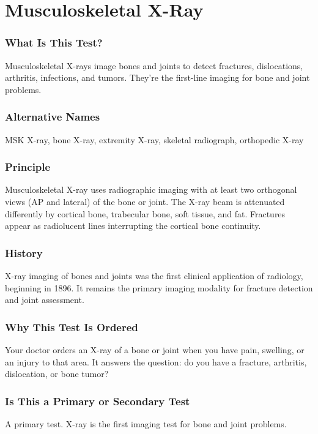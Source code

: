 \section{Musculoskeletal X-Ray}


\subsubsection*{What Is This Test?}
Musculoskeletal X-rays image bones and joints to detect fractures, dislocations, arthritis, infections, and tumors. They're the first-line imaging for bone and joint problems.

\subsubsection*{Alternative Names}
MSK X-ray, bone X-ray, extremity X-ray, skeletal radiograph, orthopedic X-ray


\subsubsection*{Principle}
Musculoskeletal X-ray uses radiographic imaging with at least two orthogonal views (AP and lateral) of the bone or joint. The X-ray beam is attenuated differently by cortical bone, trabecular bone, soft tissue, and fat. Fractures appear as radiolucent lines interrupting the cortical bone continuity.

\subsubsection*{History}
X-ray imaging of bones and joints was the first clinical application of radiology, beginning in 1896. It remains the primary imaging modality for fracture detection and joint assessment.

\subsubsection*{Why This Test Is Ordered}
Your doctor orders an X-ray of a bone or joint when you have pain, swelling, or an injury to that area. It answers the question: do you have a fracture, arthritis, dislocation, or bone tumor?

\subsubsection*{Is This a Primary or Secondary Test}
A primary test. X-ray is the first imaging test for bone and joint problems.

